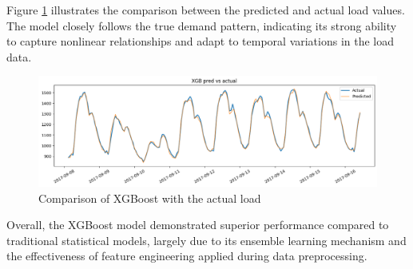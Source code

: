 Figure \ref{fig:xgboostoutput} illustrates the comparison between the predicted and actual load values. The model closely follows the true demand pattern, indicating its strong ability to capture nonlinear relationships and adapt to temporal variations in the load data.
 \begin{figure}[h!]
 	\centering
 	\includegraphics[width=0.75\linewidth]{Chapters/images/results/xgboost_output}
 	\caption{Comparison of XGBoost with the actual load}
 	\label{fig:xgboostoutput}
 \end{figure}
Overall, the XGBoost model demonstrated superior performance compared to traditional statistical models, largely due to its ensemble learning mechanism and the effectiveness of feature engineering applied during data preprocessing.


 
